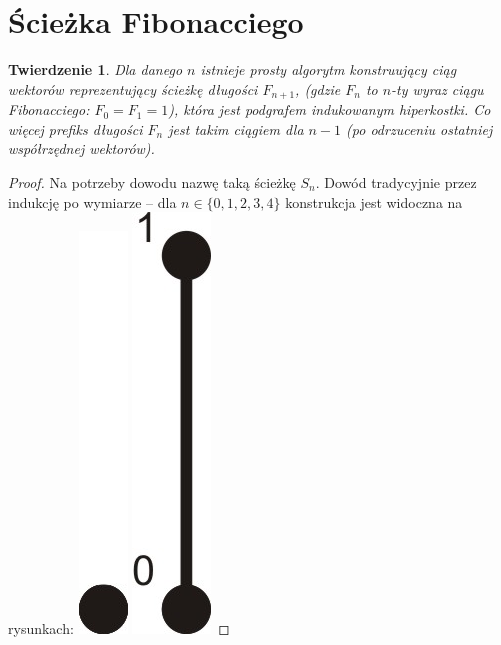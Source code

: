 \documentclass{pracamgr}
\newtheorem{theorem}{Twierdzenie}[chapter]
\begin{document}
   \section{Ścieżka Fibonacciego}
    \begin{theorem}\label{co najmniej fibo}
     Dla danego $n$ istnieje prosty algorytm konstruujący ciąg wektorów reprezentujący ścieżkę długości $F_{n+1}$,
     (gdzie $F_n$ to $n$-ty wyraz ciągu Fibonacciego: $F_0=F_1=1$), która jest podgrafem indukowanym hiperkostki.
     Co więcej prefiks długości $F_{n}$ jest takim ciągiem dla $n-1$ (po odrzuceniu ostatniej współrzędnej wektorów).
    \end{theorem}
    \begin{proof}
     Na potrzeby dowodu nazwę taką ścieżkę $S_n$.
     Dowód tradycyjnie przez indukcję po wymiarze -- dla $n\in\{0,1,2,3,4\}$ konstrukcja jest widoczna na rysunkach:\newline
     \hspace*{0pt}\includegraphics[scale=0.6]{img/Q0_long_path.jpg}
     \hspace*{12pt}\includegraphics[scale=0.6]{img/Q1_long_path.jpg}

\end{proof}
\end{document}
